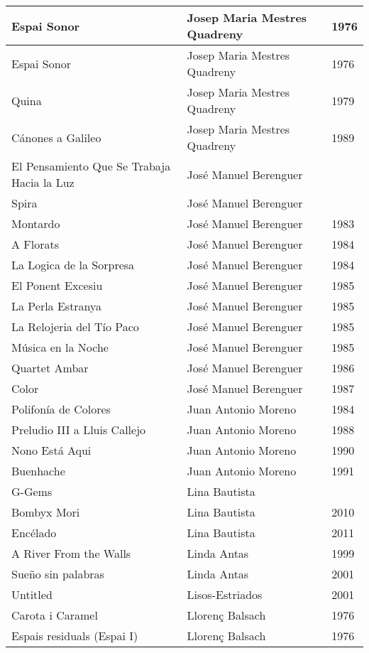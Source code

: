 \begin{center}
\begin{longtable}{| p{} | p{} | p{} |}
Espai Sonor & Josep Maria Mestres Quadreny & 1976 \\ \hline 
Espai Sonor & Josep Maria Mestres Quadreny & 1976 \\ \hline 
Quina & Josep Maria Mestres Quadreny & 1979 \\ \hline 
Cánones a Galileo & Josep Maria Mestres Quadreny & 1989 \\ \hline 
El Pensamiento Que Se Trabaja Hacia la Luz & José Manuel Berenguer &  \\ \hline 
Spira & José Manuel Berenguer &  \\ \hline 
Montardo & José Manuel Berenguer & 1983 \\ \hline 
A Florats & José Manuel Berenguer & 1984 \\ \hline 
La Logica de la Sorpresa & José Manuel Berenguer & 1984 \\ \hline 
El Ponent Excesiu & José Manuel Berenguer & 1985 \\ \hline 
La Perla Estranya & José Manuel Berenguer & 1985 \\ \hline 
La Relojeria del Tío Paco & José Manuel Berenguer & 1985 \\ \hline 
Música en la Noche & José Manuel Berenguer & 1985 \\ \hline 
Quartet Ambar & José Manuel Berenguer & 1986 \\ \hline 
Color & José Manuel Berenguer & 1987 \\ \hline 
Polifonía de Colores & Juan Antonio Moreno & 1984 \\ \hline 
Preludio III a Lluis Callejo & Juan Antonio Moreno & 1988 \\ \hline 
Nono Está Aqui & Juan Antonio Moreno & 1990 \\ \hline 
Buenhache & Juan Antonio Moreno & 1991 \\ \hline 
G-Gems & Lina Bautista &  \\ \hline 
Bombyx Mori & Lina Bautista & 2010 \\ \hline 
Encélado & Lina Bautista & 2011 \\ \hline 
A River From the Walls & Linda Antas & 1999 \\ \hline 
Sueño sin palabras & Linda Antas & 2001 \\ \hline 
Untitled & Lisos-Estriados & 2001 \\ \hline 
Carota i Caramel & Llorenç Balsach & 1976 \\ \hline 
Espais residuals (Espai I) & Llorenç Balsach & 1976 \\ \hline 

\end{longtable}
\end{center}
